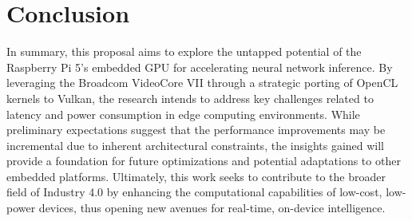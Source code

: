 \documentclass[conference]{IEEEtran}
\begin{document}
 

 \section{Conclusion}

 In summary, this proposal aims to explore the untapped potential of the Raspberry Pi 5’s embedded GPU for 
 accelerating neural network inference. By leveraging the Broadcom VideoCore VII through a strategic porting 
 of OpenCL kernels to Vulkan, the research intends to address key challenges related to latency and power 
 consumption in edge computing environments. While preliminary expectations suggest that the performance 
 improvements may be incremental due to inherent architectural constraints, the insights gained will provide a 
 foundation for future optimizations and potential adaptations to other embedded platforms. Ultimately, this 
 work seeks to contribute to the broader field of Industry 4.0 by enhancing the computational capabilities of 
 low-cost, low-power devices, thus opening new avenues for real-time, on-device intelligence.
 
 
 
 
 \vspace{12pt}
 
 
\end{document}
